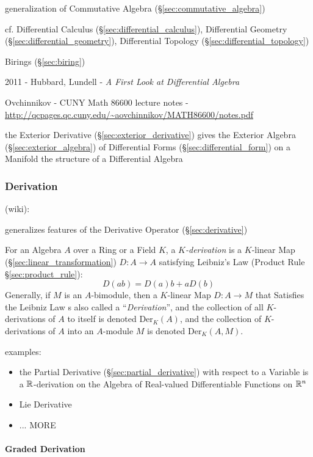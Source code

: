 generalization of Commutative Algebra (\S\ref{sec:commutative_algebra})

cf. Differential Calculus (\S\ref{sec:differential_calculus}), Differential
Geometry (\S\ref{sec:differential_geometry}), Differential Topology
(\S\ref{sec:differential_topology})

Birings (\S\ref{sec:biring})

2011 - Hubbard, Lundell - \emph{A First Look at Differential Algebra}

Ovchinnikov - CUNY Math 86600 lecture notes -
\url{http://qcpages.qc.cuny.edu/~aovchinnikov/MATH86600/notes.pdf}

the Exterior Derivative (\S\ref{sec:exterior_derivative}) gives the Exterior
Algebra (\S\ref{sec:exterior_algebra}) of Differential Forms
(\S\ref{sec:differential_form}) on a Manifold the structure of a Differential
Algebra



\subsubsection{Derivation}\label{sec:derivation}

(wiki):

generalizes features of the Derivative Operator (\S\ref{sec:derivative})

For an Algebra $A$ over a Ring or a Field $K$, a \emph{$K$-derivation} is a
$K$-linear Map (\S\ref{sec:linear_transformation}) $D : A \rightarrow A$
satisfying Leibniz's Law (Product Rule \S\ref{sec:product_rule}):
\[
  D(ab) = D(a)b + aD(b)
\]
Generally, if $M$ is an $A$-bimodule, then a $K$-linear Map $D : A \rightarrow
M$ that Satisfies the Leibniz Law s also called a ``\emph{Derivation}'', and the
collection of all $K$-derivations of $A$ to itself is denoted
$\mathrm{Der}_K(A)$, and the collection of $K$-derivations of $A$ into an
$A$-module $M$ is denoted $\mathrm{Der}_K(A, M)$.

examples:
\begin{itemize}
  \item the Partial Derivative (\S\ref{sec:partial_derivative}) with respect to
    a Variable is a $\mathbb{R}$-derivation on the Algebra of Real-valued
    Differentiable Functions on $\mathbb{R}^n$
  \item Lie Derivative
  \item ... MORE
\end{itemize}



\paragraph{Graded Derivation}\label{sec:graded_derivation}\hfill

